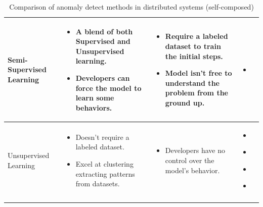 \begin{longtable}{| p{23mm} | p{46mm} | p{42mm} | p{38mm} |}
    Semi-Supervised Learning &
    \vspace{-8mm}
    \begin{itemize}[leftmargin=0mm,noitemsep,nolistsep,label={}] 
        \item A blend of both Supervised and Unsupervised learning.
        \item Developers can force the model to learn some behaviors.
        \vspace{-7mm}
    \end{itemize} &
    \vspace{-8mm}
    \begin{itemize}[leftmargin=0mm,noitemsep,nolistsep,label={}] 
        \item Require a labeled dataset to train the initial steps.
        \item Model isn’t free to understand the problem from the ground up.
        \vspace{-7mm}
    \end{itemize} &
    \vspace{-8mm}
    \begin{itemize}[leftmargin=0mm,noitemsep,nolistsep,label={}] 
        \item \cite{akcay2018ganomaly}
        \vspace{-7mm}
    \end{itemize} \\ \hline
    
    Unsupervised Learning &
    \vspace{-8mm}
    \begin{itemize}[leftmargin=0mm,noitemsep,nolistsep,label={}] 
        \item Doesn’t require a labeled dataset.
        \item Excel at clustering extracting patterns from datasets.
        \vspace{-7mm}
    \end{itemize} &
    \vspace{-8mm}
    \begin{itemize}[leftmargin=0mm,noitemsep,nolistsep,label={}] 
        \item Developers have no control over the model’s behavior.
        \vspace{-7mm}
    \end{itemize} &
    \vspace{-8mm}
    \begin{itemize}[leftmargin=0mm,noitemsep,nolistsep,label={}] 
        \item \cite{kumarage2018anomaly}
        \item \cite{zhang2019deep}
        \item \cite{kumarage2019generative}
        \item \cite{khoshnevisan2019rsm}
        \vspace{-7mm}
    \end{itemize} \\ \hline
    \caption{Comparison of anomaly detect methods in distributed systems (self-composed)}
\end{longtable}

